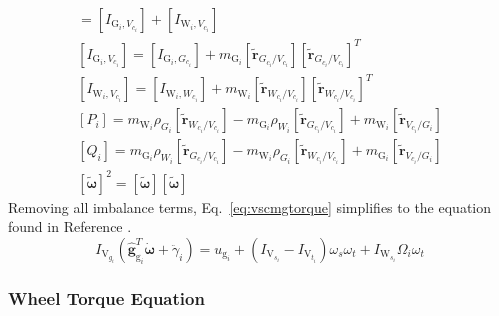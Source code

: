 \begin{gather}
[I_{\text{V}_i,V_{c_i}}] = [I_{\text{G}_i,V_{c_i}}] + [I_{\text{W}_i,V_{c_i}}]
\\
[I_{\text{G}_i,V_{c_i}}] = [I_{\text{G}_i,G_{c_i}}] + m_{\text{G}_i}[\tilde{\bm{r}}_{G_{c_i}/V_{c_i}}][\tilde{\bm{r}}_{G_{c_i}/V_{c_i}}]^T
\\
[I_{\text{W}_i,V_{c_i}}] = [I_{\text{W}_i,W_{c_i}}] + m_{\text{W}_i}[\tilde{\bm{r}}_{W_{c_i}/V_{c_i}}][\tilde{\bm{r}}_{W_{c_i}/V_{c_i}}]^T
\\
[P_i] = m_{\text{W}_i}\rho_{G_i}[\tilde{\bm{r}}_{W_{c_i}/V_{c_i}}] - m_{\text{G}_i}\rho_{W_i}[\tilde{\bm{r}}_{G_{c_i}/V_{c_i}}] + m_{\text{W}_i}[\tilde{\bm r}_{V_{c_i}/G_i}]
\\
[Q_i] = m_{\text{G}_i}\rho_{W_i}[\tilde{\bm{r}}_{G_{c_i}/V_{c_i}}] - m_{\text{W}_i}\rho_{G_i}[\tilde{\bm{r}}_{W_{c_i}/V_{c_i}}] + m_{\text{G}_i}[\tilde{\bm r}_{V_{c_i}/G_i}]
\\
[\tilde{\bm\omega}]^2 = [\tilde{\bm\omega}][\tilde{\bm\omega}]
\end{gather}
Removing all imbalance terms, Eq.~\eqref{eq:vscmgtorque} simplifies to the equation found in Reference \cite{schaub}.
\begin{equation}
I_{\text{V}_{g_i}}(\hat{\bm g}_{\text{g}_i}^T\dot{\bm{\omega}}
+  \ddot{\gamma}_i)
 = u_{\text{g}_i} + (I_{\text{V}_{s_i}}-I_{\text{V}_{t_i}})\omega_s\omega_t + I_{\text{W}_{s_i}}\Omega_i\omega_t
\label{eq:vscmgGimbalTorqueSimple}
\end{equation}

\subsubsection{Wheel Torque Equation}

